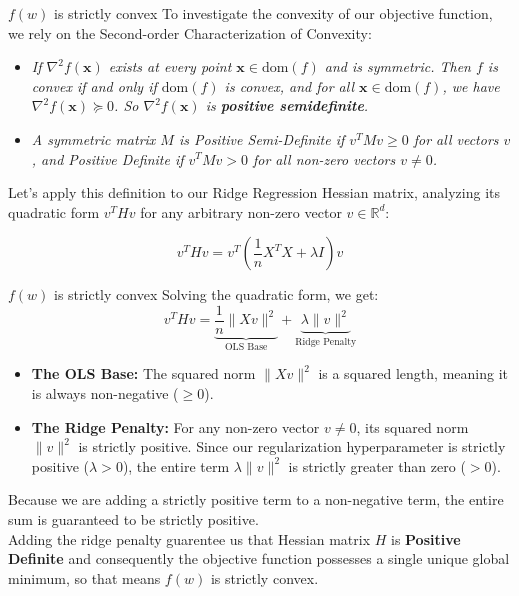 \documentclass[10pt]{beamer}
\begin{document}
\begin{frame}{$f(w)$ is strictly convex}
    To investigate the convexity of our objective function, we rely on the Second-order Characterization of Convexity: \\[0.3cm]

    \begin{itemize}
        \item \textit{If $ \nabla^2 f(\mathbf{x}) $ exists at every point $\mathbf{x} \in \mathrm{dom}(f)$ and is symmetric. Then $f$ is convex if and only if $\mathrm{dom}(f)$ is convex, and for all $\mathbf{x} \in \mathrm{dom}(f)$, we have
        $ \nabla^2 f(\mathbf{x}) \succeq 0 $. So $\nabla^2 f(\mathbf{x})$ is \textbf{positive semidefinite}.}
        \item \textit{A symmetric matrix $M$ is Positive Semi-Definite if $v^T M v \ge 0$ for all vectors $v$, and Positive Definite if $v^T M v > 0$ for all non-zero vectors $v \neq 0$.}\\[0.3cm]

    \end{itemize}

    Let's apply this definition to our Ridge Regression Hessian matrix, analyzing its quadratic form $v^T H v$ for any arbitrary non-zero vector $v \in \mathbb{R}^d$:

    $$v^T H v = v^T \left( \frac{1}{n} X^T X + \lambda I \right) v$$

\end{frame}

\begin{frame}{$f(w)$ is strictly convex}
    Solving the quadratic form, we get:
    $$v^T H v = \underbrace{\frac{1}{n} \|Xv\|^2}_{\text{OLS Base}} + \underbrace{\lambda \|v\|^2}_{\text{Ridge Penalty}}$$

    \begin{itemize}
        \item \textbf{The OLS Base:} The squared norm $\|Xv\|^2$ is a squared length, meaning it is always non-negative ($\ge 0$).
        \item \textbf{The Ridge Penalty:} For any non-zero vector $v \neq 0$, its squared norm $\|v\|^2$ is strictly positive. Since our regularization hyperparameter is strictly positive ($\lambda > 0$), the entire term $\lambda \|v\|^2$ is strictly greater than zero ($> 0$).
    \end{itemize}

    Because we are adding a strictly positive term to a non-negative term, the entire sum is guaranteed to be strictly positive.\\[0.1cm] 
    Adding the ridge penalty guarentee us that Hessian matrix $H$ is \textbf{Positive Definite} and consequently the objective function possesses a single unique global minimum, so that means $f(w)$ is strictly convex.
\end{frame}
\end{document}

